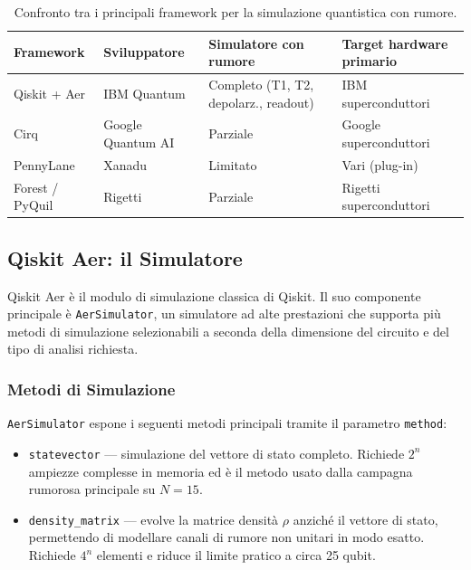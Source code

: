 \begin{onehalfspace}
\begin{table}[H]
\centering
\caption{Confronto tra i principali framework per la simulazione quantistica con rumore.}
\label{tab:framework_confronto}
\begin{tabularx}{\textwidth}{lXXX}
\toprule
\textbf{Framework} & \textbf{Sviluppatore} & \textbf{Simulatore con rumore} & \textbf{Target hardware primario} \\
\midrule
Qiskit + Aer        & IBM Quantum           & Completo (T1, T2, depolarz., readout) & IBM superconduttori \\
Cirq                & Google Quantum AI     & Parziale                               & Google superconduttori \\
PennyLane           & Xanadu                & Limitato                               & Vari (plug-in) \\
Forest / PyQuil     & Rigetti               & Parziale                               & Rigetti superconduttori \\
\bottomrule
\end{tabularx}
\end{table}

\subsection{Qiskit Aer: il Simulatore}
\label{sec:qiskit_aer}

Qiskit Aer è il modulo di simulazione classica di Qiskit. Il suo componente principale è \texttt{AerSimulator}, un simulatore ad alte prestazioni che supporta più metodi di simulazione selezionabili a seconda della dimensione del circuito e del tipo di analisi richiesta.

\subsubsection{Metodi di Simulazione}

\texttt{AerSimulator} espone i seguenti metodi principali tramite il parametro \texttt{method}:

\begin{itemize}
    \item \texttt{statevector} — simulazione del vettore di stato completo. Richiede $2^n$ ampiezze complesse in memoria ed è il metodo usato dalla campagna rumorosa principale su $N=15$.

    \item \texttt{density\_matrix} — evolve la matrice densità $\rho$ anziché il vettore di stato, permettendo di modellare canali di rumore non unitari in modo esatto. Richiede $4^n$ elementi e riduce il limite pratico a circa 25 qubit.


\end{itemize}
\end{onehalfspace}
